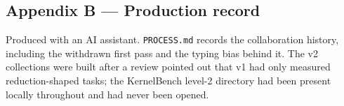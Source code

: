 \documentclass[
  11pt,
]{article}
\begin{document}
\hypertarget{appendix-b-production-record}{%
\subsection{Appendix B --- Production
record}\label{appendix-b-production-record}}

Produced with an AI assistant. \texttt{PROCESS.md} records the
collaboration history, including the withdrawn first pass and the typing
bias behind it. The v2 collections were built after a review pointed out
that v1 had only measured reduction-shaped tasks; the KernelBench
level-2 directory had been present locally throughout and had never been
opened.

\hypertarget{refs}{}
\end{document}
